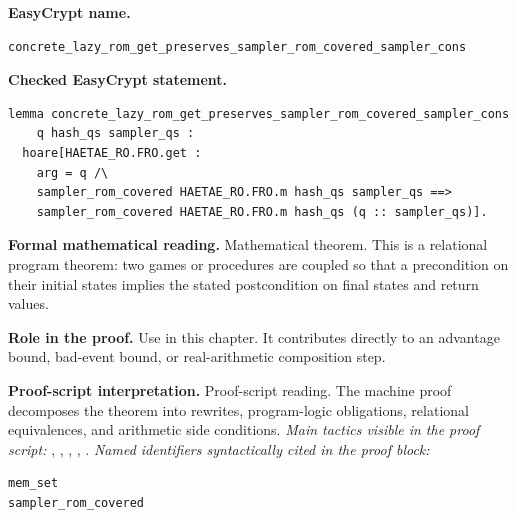 \begin{formaltheorem}
\noindent\textbf{EasyCrypt name.}
\begin{lstlisting}[language=EasyCrypt,basicstyle=\ttfamily\scriptsize]
concrete_lazy_rom_get_preserves_sampler_rom_covered_sampler_cons
\end{lstlisting}
\noindent\textbf{Checked EasyCrypt statement.}
\begin{lstlisting}[language=EasyCrypt,basicstyle=\ttfamily\scriptsize]
lemma concrete_lazy_rom_get_preserves_sampler_rom_covered_sampler_cons
    q hash_qs sampler_qs :
  hoare[HAETAE_RO.FRO.get :
    arg = q /\
    sampler_rom_covered HAETAE_RO.FRO.m hash_qs sampler_qs ==>
    sampler_rom_covered HAETAE_RO.FRO.m hash_qs (q :: sampler_qs)].
\end{lstlisting}
\noindent\textbf{Formal mathematical reading.}
Mathematical theorem. This is a relational program theorem: two games or procedures are coupled so that a precondition on their initial states implies the stated postcondition on final states and return values.

\noindent\textbf{Role in the proof.}
Use in this chapter. It contributes directly to an advantage bound, bad-event bound, or real-arithmetic composition step.

\noindent\textbf{Proof-script interpretation.}
Proof-script reading. The machine proof decomposes the theorem into rewrites, program-logic obligations, relational equivalences, and arithmetic side conditions.
\emph{Main tactics visible in the proof script:} \ec{proc}, \ec{wp}, \ec{rnd}, \ec{rewrite}, \ec{smt}.
\emph{Named identifiers syntactically cited in the proof block:}
\begin{lstlisting}[language=EasyCrypt,basicstyle=\ttfamily\scriptsize]
mem_set
sampler_rom_covered
\end{lstlisting}

\end{formaltheorem}

